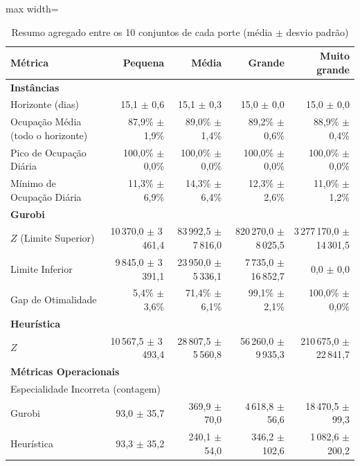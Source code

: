 \begin{table}[htbp]
    \caption{Resumo agregado entre os 10 conjuntos de cada porte (média $\pm$ desvio padrão)}
    \label{tab:agregado}
    \centering
    \begin{adjustbox}{max width=\textwidth}
    \begin{tabular}{lrrrr}
        \hline
        \textbf{Métrica} & \textbf{Pequena} & \textbf{Média} & \textbf{Grande} & \textbf{Muito grande} \\
        \hline
        \multicolumn{5}{l}{\textbf{Instâncias}} \\
        Horizonte (dias) & 15,1 $\pm$ 0,6 & 15,1 $\pm$ 0,3 & 15,0 $\pm$ 0,0 & 15,0 $\pm$ 0,0 \\
        Ocupação Média (todo o horizonte) & 87,9\% $\pm$ 1,9\% & 89,0\% $\pm$ 1,4\% & 89,2\% $\pm$ 0,6\% & 88,9\% $\pm$ 0,4\% \\
        Pico de Ocupação Diária & 100,0\% $\pm$ 0,0\% & 100,0\% $\pm$ 0,0\% & 100,0\% $\pm$ 0,0\% & 100,0\% $\pm$ 0,0\% \\
        Mínimo de Ocupação Diária & 11,3\% $\pm$ 6,9\% & 14,3\% $\pm$ 6,4\% & 12,3\% $\pm$ 2,6\% & 11,0\% $\pm$ 1,2\% \\
        \hline
        \multicolumn{5}{l}{\textbf{Gurobi}} \\
        $Z$ (Limite Superior) & 10\,370,0 $\pm$ 3\,461,4 & 83\,992,5 $\pm$ 7\,816,0 & 820\,270,0 $\pm$ 8\,025,5 & 3\,277\,170,0 $\pm$ 14\,301,5 \\
        Limite Inferior & 9\,845,0 $\pm$ 3\,391,1 & 23\,950,0 $\pm$ 5\,336,1 & 7\,735,0 $\pm$ 16\,852,7 & 0,0 $\pm$ 0,0 \\
        Gap de Otimalidade & 5,4\% $\pm$ 3,6\% & 71,4\% $\pm$ 6,1\% & 99,1\% $\pm$ 2,1\% & 100,0\% $\pm$ 0,0\% \\
        \hline
        \multicolumn{5}{l}{\textbf{Heurística}} \\
        $Z$ & 10\,567,5 $\pm$ 3\,493,4 & 28\,807,5 $\pm$ 5\,560,8 & 56\,260,0 $\pm$ 9\,935,3 & 210\,675,0 $\pm$ 22\,841,7 \\
        \hline
        \multicolumn{5}{l}{\textbf{Métricas Operacionais}} \\
        \multicolumn{5}{l}{Especialidade Incorreta (contagem)} \\
        \quad Gurobi & 93,0 $\pm$ 35,7 & 369,9 $\pm$ 70,0 & 4\,618,8 $\pm$ 56,6 & 18\,470,5 $\pm$ 99,3 \\
        \quad Heurística & 93,3 $\pm$ 35,2 & 240,1 $\pm$ 54,0 & 346,2 $\pm$ 102,6 & 1\,082,6 $\pm$ 200,2 \\

\end{tabular}
\end{adjustbox}
\end{table}
